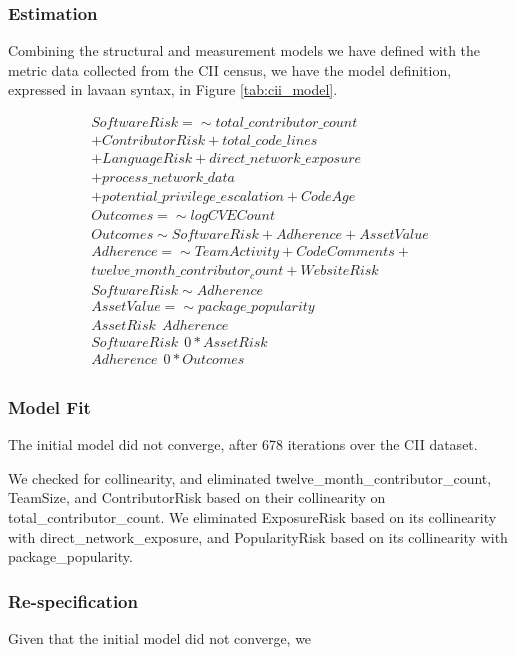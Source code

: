 \subsubsection{Estimation}


Combining the structural and measurement models we have defined with the metric data collected from the CII census, we have the model definition, expressed in lavaan syntax, in Figure \ref{tab:cii_model}.

\begin{align*}
SoftwareRisk =\sim  total\_contributor\_count\\ + ContributorRisk + total\_code\_lines\\ 
+ LanguageRisk + direct\_network\_exposure\\
 + process\_network\_data \\ 
+ potential\_privilege\_escalation + CodeAge \\
Outcomes =\sim  logCVECount \\
Outcomes \sim SoftwareRisk + Adherence + AssetValue \\
Adherence =\sim  TeamActivity + CodeComments + \\
	twelve\_month\_contributor_count + WebsiteRisk  \\
SoftwareRisk \sim  Adherence \\
AssetValue =\sim package\_popularity \\
AssetRisk ~~  Adherence\\
SoftwareRisk ~~ 0*AssetRisk\\
Adherence ~~ 0*Outcomes\\
\end{align*}

\subsubsection{Model Fit}
The initial model did not converge, after 678 iterations over the CII dataset.

We checked for collinearity, and eliminated twelve\_month\_contributor\_count, TeamSize, and ContributorRisk based on their collinearity on total\_contributor\_count. We eliminated ExposureRisk based on its collinearity with direct\_network\_exposure, and PopularityRisk based on its collinearity with package\_popularity.
 
\subsubsection{Re-specification}
Given that the initial model did not converge, we 
 
